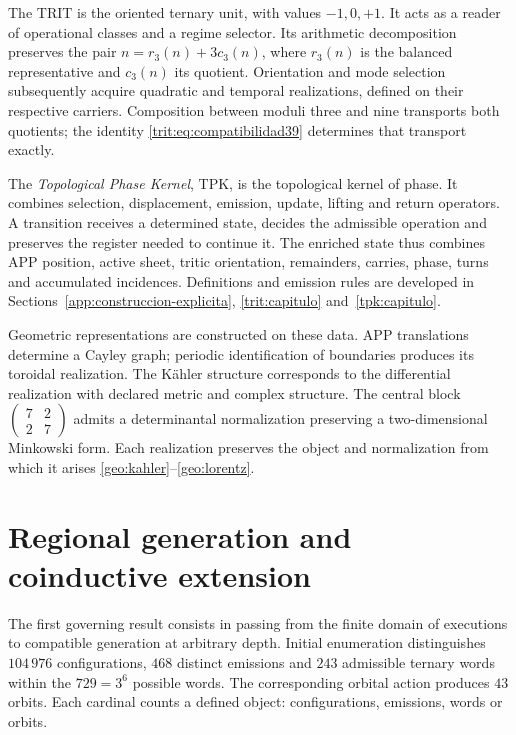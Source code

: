 The TRIT is the oriented ternary unit, with values \(-1,0,+1\). It acts as a reader of operational classes and a regime selector. Its arithmetic decomposition preserves the pair \(n=r_3(n)+3c_3(n)\), where \(r_3(n)\) is the balanced representative and \(c_3(n)\) its quotient. Orientation and mode selection subsequently acquire quadratic and temporal realizations, defined on their respective carriers. Composition between moduli three and nine transports both quotients; the identity \eqref{trit:eq:compatibilidad39} determines that transport exactly.

The \emph{Topological Phase Kernel}, TPK, is the topological kernel of phase. It combines selection, displacement, emission, update, lifting and return operators. A transition receives a determined state, decides the admissible operation and preserves the register needed to continue it. The enriched state thus combines APP position, active sheet, tritic orientation, remainders, carries, phase, turns and accumulated incidences. Definitions and emission rules are developed in Sections~\ref{app:construccion-explicita}, \ref{trit:capitulo} and~\ref{tpk:capitulo}.

Geometric representations are constructed on these data. APP translations determine a Cayley graph; periodic identification of boundaries produces its toroidal realization. The Kähler structure corresponds to the differential realization with declared metric and complex structure. The central block \(\left(\begin{smallmatrix}7&2\\2&7\end{smallmatrix}\right)\) admits a determinantal normalization preserving a two-dimensional Minkowski form. Each realization preserves the object and normalization from which it arises \ref{geo:kahler}--\ref{geo:lorentz}.

\section*{Regional generation and coinductive extension}

The first governing result consists in passing from the finite domain of executions to compatible generation at arbitrary depth. Initial enumeration distinguishes \(104\,976\) configurations, \(468\) distinct emissions and \(243\) admissible ternary words within the \(729=3^6\) possible words. The corresponding orbital action produces \(43\) orbits. Each cardinal counts a defined object: configurations, emissions, words or orbits.

